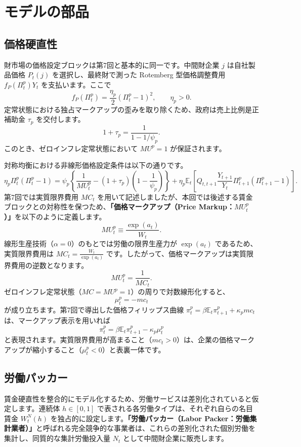 \documentclass[
  japanese,
  lualatex,
  ja=standard,
  12pt,
  a4paper]{ltjsarticle}
\begin{document}
\section{モデルの部品}\label{ux30e2ux30c7ux30ebux306eux90e8ux54c1}

\subsection{価格硬直性}\label{ux4fa1ux683cux786cux76f4ux6027}

財市場の価格設定ブロックは第7回と基本的に同一です。中間財企業 \(j\)
は自社製品価格 \(P_t(j)\) を選択し、最終財で測った Rotemberg
型価格調整費用 \(f_P(\Pi_t^p)Y_t\) を支払います。ここで \[
f_P(\Pi_t^p)=\frac{\eta_p}{2}(\Pi_t^p-1)^2,
\qquad
\eta_p>0.
\]
定常状態における独占マークアップの歪みを取り除くため、政府は売上比例是正補助金
\(\tau_p\) を交付します。 \[
1+\tau_p=\frac{1}{1-1/\psi_p}.
\] このとき、ゼロインフレ定常状態において \(MU^p=1\) が保証されます。

対称均衡における非線形価格設定条件は以下の通りです。 \[
\eta_p\Pi_t^p(\Pi_t^p-1)
=
\psi_p
\left\{
\frac{1}{MU_t^p}
-
(1+\tau_p)\left(1-\frac{1}{\psi_p}\right)
\right\}
+
\eta_p\mathbb{E}_t
\left[
Q_{t,t+1}
\frac{Y_{t+1}}{Y_t}
\Pi_{t+1}^p(\Pi_{t+1}^p-1)
\right].
\] 第7回では実質限界費用 \(MC_t\)
を用いて記述しましたが、本回では後述する賃金ブロックとの対称性を保つため、\textbf{「価格マークアップ（Price
Markup：\(MU_t^p\)）」}を以下のように定義します。 \[
MU_t^p\equiv\frac{\exp(a_t)}{W_t}.
\] 線形生産技術（\(\alpha=0\)）のもとでは労働の限界生産力が
\(\exp(a_t)\) であるため、実質限界費用は
\(MC_t = \frac{W_t}{\exp(a_t)}\)
です。したがって、価格マークアップは実質限界費用の逆数となります。 \[
MU_t^p=\frac{1}{MC_t}.
\] ゼロインフレ定常状態（\(MC=MU^p=1\)）の周りで対数線形化すると、 \[
\mu_t^p=-mc_t
\] が成り立ちます。第7回で導出した価格フィリップス曲線
\(\pi_t^p = \beta\mathbb{E}_t\pi_{t+1}^p + \kappa_p mc_t\)
は、マークアップ表示を用いれば \[
\pi_t^p
=
\beta\mathbb{E}_t\pi_{t+1}^p
-
\kappa_p\mu_t^p
\]
と表現されます。実質限界費用が高まること（\(mc_t>0\)）は、企業の価格マークアップが縮小すること（\(\mu_t^p<0\)）と表裏一体です。

\subsection{労働パッカー}\label{ux52b4ux50cdux30d1ux30c3ux30abux30fc}

賃金硬直性を整合的にモデル化するため、労働サービスは差別化されていると仮定します。連続体
\(h\in[0,1]\) で表される各労働タイプは、それぞれ自らの名目賃金
\(W_t^N(h)\) を独占的に設定します。\textbf{「労働パッカー（Labor
Packer：労働集計業者）」}と呼ばれる完全競争的な事業者は、これらの差別化された個別労働を集計し、同質的な集計労働投入量
\(N_t\) として中間財企業に販売します。
\end{document}
